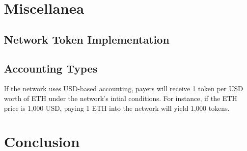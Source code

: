 \documentclass{article}
\begin{document}
\section{Miscellanea}

\subsection{Network Token Implementation}

\subsection{Accounting Types}\label{sec:accounting_types}

If the network uses USD-based accounting, payers will receive 1 token per USD worth of ETH under the network's intial conditions. For instance, if the ETH price is 1,000 USD, paying 1 ETH into the network will yield 1,000 tokens.

\section{Conclusion}



\end{document}
